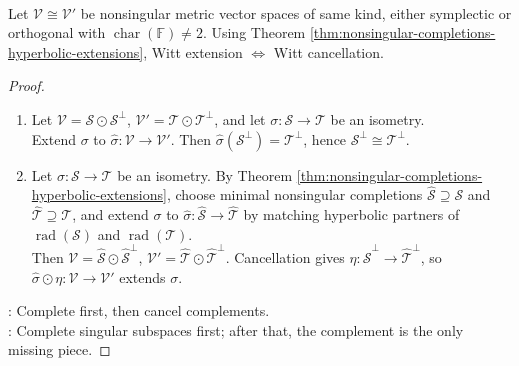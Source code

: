 \begin{proposition} \label{prop:witt-extension-cancellation-bridge} \\
Let $\mathcal{V}\cong\mathcal{V}'$ be nonsingular metric vector spaces of same kind, either symplectic or orthogonal with $\operatorname{char}(\mathbb{F})\neq2$. Using Theorem \ref{thm:nonsingular-completions-hyperbolic-extensions}, Witt extension $\iff$ Witt cancellation.
\begin{proof}
\begin{enumerate}[label=\roman*.]
\setlength{\itemsep}{0pt}
\item[$(\Rightarrow)$] Let $\mathcal{V}=\mathcal{S}\odot\mathcal{S}^{\perp}$, $\mathcal{V}'=\mathcal{T}\odot\mathcal{T}^{\perp}$, and let $\sigma:\mathcal{S}\to\mathcal{T}$ be an isometry.\\
Extend $\sigma$ to $\widehat{\sigma}:\mathcal{V}\to\mathcal{V}'$. Then $\widehat{\sigma}(\mathcal{S}^{\perp})=\mathcal{T}^{\perp}$, hence $\mathcal{S}^{\perp}\cong\mathcal{T}^{\perp}$.
\item[$(\Leftarrow)$] Let $\sigma:\mathcal{S}\to\mathcal{T}$ be an isometry. By Theorem \ref{thm:nonsingular-completions-hyperbolic-extensions}, choose minimal nonsingular completions $\widehat{\mathcal{S}}\supseteq\mathcal{S}$ and $\widehat{\mathcal{T}}\supseteq\mathcal{T}$, and extend $\sigma$ to $\widehat{\sigma}:\widehat{\mathcal{S}}\to\widehat{\mathcal{T}}$ by matching hyperbolic partners of $\operatorname{rad}(\mathcal{S})$ and $\operatorname{rad}(\mathcal{T})$.\\
Then $\mathcal{V}=\widehat{\mathcal{S}}\odot\widehat{\mathcal{S}}^{\perp}$, $\mathcal{V}'=\widehat{\mathcal{T}}\odot\widehat{\mathcal{T}}^{\perp}$. Cancellation gives $\eta:\widehat{\mathcal{S}}^{\perp}\to\widehat{\mathcal{T}}^{\perp}$, so $\widehat{\sigma}\odot\eta:\mathcal{V}\to\mathcal{V}'$ extends $\sigma$.
\end{enumerate}
: Complete first, then cancel complements.\\
: Complete singular subspaces first; after that, the complement is the only missing piece.
\end{proof}
\end{proposition}

